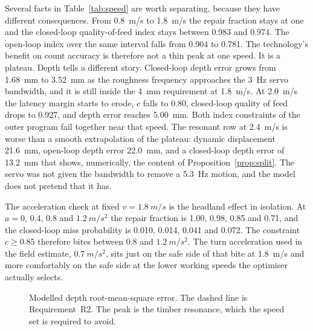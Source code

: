 Several facts in Table~\ref{tab:speed} are worth separating, because they have different consequences. From \SI{0.8}{m/s} to \SI{1.8}{m/s} the repair fraction stays at one and the closed-loop quality-of-feed index stays between \num{0.983} and \num{0.974}. The open-loop index over the same interval falls from \num{0.904} to \num{0.781}. The technology's benefit on count accuracy is therefore not a thin peak at one speed. It is a plateau. Depth tells a different story. Closed-loop depth error grows from \SI{1.68}{mm} to \SI{3.52}{mm} as the roughness frequency approaches the \SI{3}{Hz} servo bandwidth, and it is still inside the \SI{4}{mm} requirement at \SI{1.8}{m/s}. At \SI{2.0}{m/s} the latency margin starts to erode, \(c\) falls to \num{0.80}, closed-loop quality of feed drops to \num{0.927}, and depth error reaches \SI{5.00}{mm}. Both index constraints of the outer program fail together near that speed. The resonant row at \SI{2.4}{m/s} is worse than a smooth extrapolation of the plateau: dynamic displacement \SI{21.6}{mm}, open-loop depth error \SI{22.0}{mm}, and a closed-loop depth error of \SI{13.2}{mm} that shows, numerically, the content of Proposition~\ref{prop:split}. The servo was not given the bandwidth to remove a \SI{5.3}{Hz} motion, and the model does not pretend that it has.

The acceleration check at fixed \(v=\SI{1.8}{m/s}\) is the headland effect in isolation. At \(a=0\), \(0.4\), \(0.8\) and \(\SI{1.2}{m/s^2}\) the repair fraction is \num{1.00}, \num{0.98}, \num{0.85} and \num{0.71}, and the closed-loop miss probability is \num{0.010}, \num{0.014}, \num{0.041} and \num{0.072}. The constraint \(c\ge 0.85\) therefore bites between \num{0.8} and \(\SI{1.2}{m/s^2}\). The turn acceleration used in the field estimate, \(\SI{0.7}{m/s^2}\), sits just on the safe side of that bite at \SI{1.8}{m/s} and more comfortably on the safe side at the lower working speeds the optimiser actually selects.

\begin{figure}[ht]
\centering
{}
\caption{Modelled depth root-mean-square error. The dashed line is Requirement~R2. The peak is the timber resonance, which the speed set is required to avoid.}
\label{fig:depth}
\end{figure}

